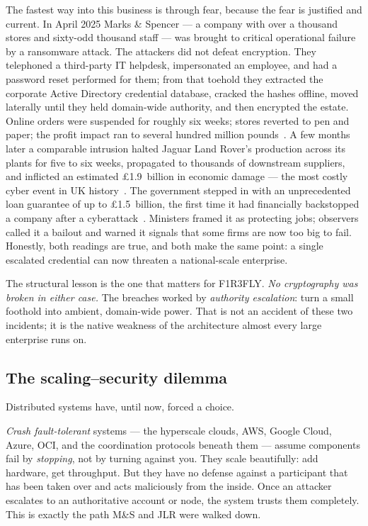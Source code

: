 \documentclass[11pt]{article}
\begin{document}
The fastest way into this business is through fear, because the fear is justified and current. In April 2025 Marks \& Spencer --- a company with over a thousand stores and sixty-odd thousand staff --- was brought to critical operational failure by a ransomware attack. The attackers did not defeat encryption. They telephoned a third-party IT helpdesk, impersonated an employee, and had a password reset performed for them; from that toehold they extracted the corporate Active Directory credential database, cracked the hashes offline, moved laterally until they held domain-wide authority, and then encrypted the estate. Online orders were suspended for roughly six weeks; stores reverted to pen and paper; the profit impact ran to several hundred million pounds~\cite{msProfit,msKill}. A few months later a comparable intrusion halted Jaguar Land Rover's production across its plants for five to six weeks, propagated to thousands of downstream suppliers, and inflicted an estimated \pounds1.9~billion in economic damage --- the most costly cyber event in UK history~\cite{jlrCost}. The government stepped in with an unprecedented loan guarantee of up to \pounds1.5~billion, the first time it had financially backstopped a company after a cyberattack~\cite{jlrLoan}. Ministers framed it as protecting jobs; observers called it a bailout and warned it signals that some firms are now too big to fail. Honestly, both readings are true, and both make the same point: a single escalated credential can now threaten a national-scale enterprise.

The structural lesson is the one that matters for F1R3FLY. \emph{No cryptography was broken in either case.} The breaches worked by \emph{authority escalation}: turn a small foothold into ambient, domain-wide power. That is not an accident of these two incidents; it is the native weakness of the architecture almost every large enterprise runs on.

\subsection*{The scaling--security dilemma}

Distributed systems have, until now, forced a choice.

\emph{Crash fault-tolerant} systems --- the hyperscale clouds, AWS, Google Cloud, Azure, OCI, and the coordination protocols beneath them --- assume components fail by \emph{stopping}, not by turning against you. They scale beautifully: add hardware, get throughput. But they have no defense against a participant that has been taken over and acts maliciously from the inside. Once an attacker escalates to an authoritative account or node, the system trusts them completely. This is exactly the path M\&S and JLR were walked down.
\end{document}
